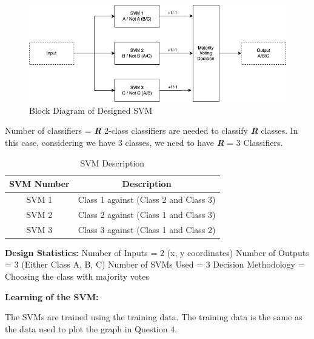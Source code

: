 \documentclass[12pt]{report}
\begin{document}
\begin{figure}[H]
	\centering
	\includegraphics[width=\textwidth]{block.png}
	\caption{Block Diagram of Designed SVM}
\end{figure}

Number of classifiers = \textit{\textbf{R}} 2-class classifiers are needed to classify \textit{\textbf{R}} classes.
In this case, considering we have 3 classes, we need to have \textit{\textbf{R}} = 3 Classifiers.

\begin{table}[H]
	\centering
	\begin{tabular}{|c | c|}
		\hline
		SVM Number & Description                           \\ [0.5ex]
		\hline
		SVM 1      & Class 1 against (Class 2 and Class 3) \\
		\hline
		SVM 2      & Class 2 against (Class 1 and Class 3) \\
		\hline
		SVM 3      & Class 3 against (Class 1 and Class 2) \\
		\hline
	\end{tabular}
	\caption{SVM Description}
\end{table}



\textbf{Design Statistics:}\newline\newline
Number of Inputs = 2 (x, y coordinates)\newline
Number of Outputs = 3 (Either Class A, B, C)\newline
Number of SVMs Used = 3\newline
Decision Methodology  = Choosing the class with majority votes\newline\newline

\textbf{Learning of the SVM:}\newline

The SVMs are trained using the training data. The training data is the same as the data used to plot the graph in Question 4.
\end{document}
